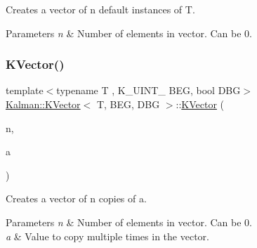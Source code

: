 Creates a vector of {\ttfamily n} default instances of {\ttfamily T}. 


\begin{DoxyParams}{Parameters}
{\em n} & Number of elements in vector. Can be 0. \\
\hline
\end{DoxyParams}
\mbox{\label{classKalman_1_1KVector_aaeec01812b3f0747f5b623a952ea2fbb}} 
\subsubsection{\texorpdfstring{K\+Vector()}{KVector()}\hspace{0.1cm}{\footnotesize\ttfamily [2/4]}}
{\footnotesize\ttfamily template$<$typename T , K\+\_\+\+U\+I\+N\+T\+\_ B\+EG, bool D\+BG$>$ \\
\mbox{\hyperlink{classKalman_1_1KVector}{Kalman\+::\+K\+Vector}}$<$ T, B\+EG, D\+BG $>$\+::\mbox{\hyperlink{classKalman_1_1KVector}{K\+Vector}} (\begin{DoxyParamCaption}\item[{\mbox{\hyperlink{namespaceKalman_a628a50cae10f6e2035393d4f96c698bd}{K\+\_\+\+U\+I\+N\+T\+\_\+32}}}]{n,  }\item[{const T \&}]{a }\end{DoxyParamCaption})\hspace{0.3cm}{\ttfamily [inline]}}



Creates a vector of {\ttfamily n} copies of {\ttfamily a}. 


\begin{DoxyParams}{Parameters}
{\em n} & Number of elements in vector. Can be 0. \\
\hline
{\em a} & Value to copy multiple times in the vector. \\
\hline
\end{DoxyParams}
\mbox{\label{classKalman_1_1KVector_a7b42e18da011d77bc603a80c27d2fcb2}} 
